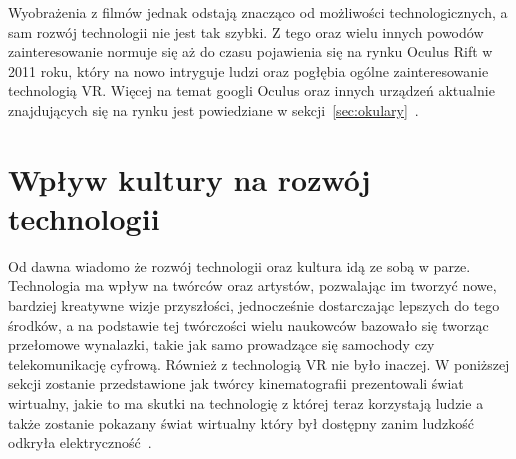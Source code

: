 Wyobrażenia z filmów jednak odstają znacząco od możliwości technologicznych, a sam rozwój technologii nie jest tak szybki. Z tego oraz wielu innych powodów zainteresowanie normuje się aż do czasu pojawienia się na rynku Oculus Rift  w 2011 roku, który na nowo intryguje ludzi oraz pogłębia ogólne zainteresowanie technologią VR. Więcej na temat googli Oculus oraz innych urządzeń aktualnie znajdujących się na rynku jest powiedziane w sekcji~\ref{sec:okulary}~\cite{historia}.
  
\section{Wpływ kultury na rozwój technologii}
\label{sec:wplyw}
Od dawna wiadomo że rozwój technologii oraz kultura idą ze sobą w parze. Technologia ma wpływ na twórców oraz artystów, pozwalając im tworzyć nowe, bardziej kreatywne wizje przyszłości, jednocześnie dostarczając lepszych do tego środków, a na podstawie tej twórczości wielu naukowców bazowało się tworząc przełomowe wynalazki, takie jak samo prowadzące się samochody czy telekomunikację cyfrową. Również z technologią VR nie było inaczej. W poniższej sekcji zostanie przedstawione jak twórcy kinematografii prezentowali świat wirtualny, jakie to ma skutki na technologię z której teraz korzystają ludzie a także zostanie pokazany świat wirtualny który był dostępny zanim ludzkość odkryła elektryczność~\cite{wynalazki}.

